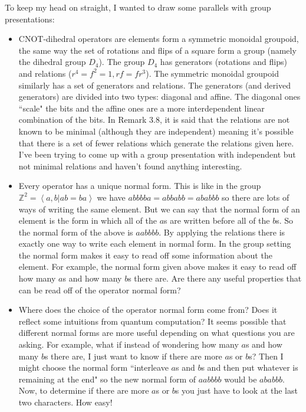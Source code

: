 \documentclass{amsart}
\begin{document}
To keep my head on straight, I wanted to draw some parallels with group presentations:
\begin{itemize}
    \item CNOT-dihedral operators are elements form a symmetric monoidal groupoid, the same way the set of rotations and flips of a square form a group (namely the dihedral group $D_4$). The group $D_4$ has generators (rotations and flips) and relations ($r^4 = f^2 = 1, rf = fr^3$). The symmetric monoidal groupoid similarly has a set of generators and relations. The generators (and derived generators) are divided into two types: diagonal and affine. The diagonal ones ``scale" the bits and  the affine ones are a more interdependent  linear combination of the bits. In Remark 3.8, it is said that the relations are not known to be minimal (although they are independent) meaning it's possible that there is a set of fewer relations which generate the relations given here. I've been trying to come up with a group presentation with independent but not minimal relations and haven't found anything interesting.
    \item Every operator has a unique normal form. This is like in the group $\mathbb Z^2 = \left< a, b | ab = ba\right>$ we have $abbbba = abbabb = ababbb$ so there are lots of ways of writing the same element. But we can say that the normal form of an element is the form in which all of the $a$s are written before all of the $b$s. So the normal form of the above is $aabbbb$. By applying the relations there is exactly one way to write each element in normal form. In the group setting the normal form makes it easy to read off some information about the element. For example, the normal form given above makes it easy to read off how many $a$s and how many $b$s there are. Are there any useful properties that can be read off of the operator normal form?

    \item Where does the choice of the operator normal form come from? Does it reflect some intuitions from quantum computation? It seems possible that different normal forms are more useful depending on what questions you are asking. For example, what if instead of wondering how many $a$s and how many $b$s there are, I just want to know if there are more $a$s or $b$s? Then I might choose the normal form ``interleave $a$s and $b$s and then put whatever is remaining at the end" so the new normal form of $aabbbb$ would be $ababbb$. Now, to determine if there are more $a$s or $b$s you just have to look at the last two characters. How easy!
\end{itemize}
\end{document}

